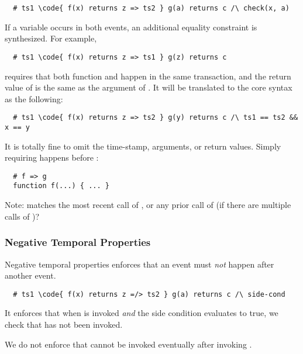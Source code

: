 \begin{lstlisting}
  # ts1 \code{ f(x) returns z => ts2 } g(a) returns c /\ check(x, a)
\end{lstlisting}

If a variable occurs in both events, an additional equality constraint
is synthesized.  For example,
\begin{lstlisting}
  # ts1 \code{ f(x) returns z => ts1 } g(z) returns c
\end{lstlisting}
requires that both function  and  happen in the same transaction,
and the return value of  is the same as the argument of .
It will be translated to the core syntax as the following:
\begin{lstlisting}
  # ts1 \code{ f(x) returns z => ts2 } g(y) returns c /\ ts1 == ts2 && x == y
\end{lstlisting}

It is totally fine to omit the time-stamp, arguments, or return values.
Simply requiring  happens before :
\begin{lstlisting}
  # f => g
  function f(...) { ... }
\end{lstlisting}


Note:  matches the most recent call of ,
or any prior call of  (if there are multiple calls of )?



\subsubsection{Negative Temporal Properties}

Negative temporal properties enforces that an event must \emph{not}
happen after another event.

\begin{lstlisting}
  # ts1 \code{ f(x) returns z =/> ts2 } g(a) returns c /\ side-cond
\end{lstlisting}
It enforces that when  is invoked \emph{and} the side condition
evaluates to true, we check that  has not been invoked.

We do not enforce that  cannot be invoked eventually
after invoking .

